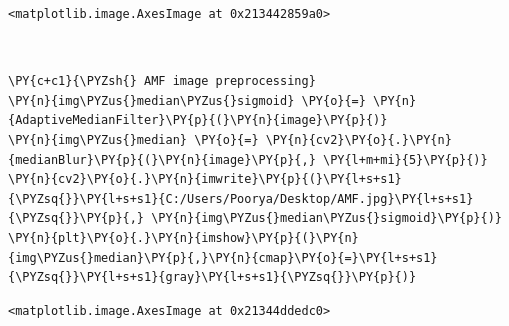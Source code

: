 \begin{tcolorbox}[breakable, size=fbox, boxrule=.5pt, pad at break*=1mm, opacityfill=0]
	\begin{Verbatim}[commandchars=\\\{\}]
<matplotlib.image.AxesImage at 0x213442859a0>
	\end{Verbatim}
\end{tcolorbox}

\begin{center}
\end{center}
{ \hspace*{\fill} \\}

\begin{tcolorbox}[breakable, size=fbox, boxrule=1pt, pad at break*=1mm,colback=cellbackground, colframe=cellborder]
	\begin{Verbatim}[commandchars=\\\{\}]
\PY{c+c1}{\PYZsh{} AMF image preprocessing}
\PY{n}{img\PYZus{}median\PYZus{}sigmoid} \PY{o}{=} \PY{n}{AdaptiveMedianFilter}\PY{p}{(}\PY{n}{image}\PY{p}{)}
\PY{n}{img\PYZus{}median} \PY{o}{=} \PY{n}{cv2}\PY{o}{.}\PY{n}{medianBlur}\PY{p}{(}\PY{n}{image}\PY{p}{,} \PY{l+m+mi}{5}\PY{p}{)}
\PY{n}{cv2}\PY{o}{.}\PY{n}{imwrite}\PY{p}{(}\PY{l+s+s1}{\PYZsq{}}\PY{l+s+s1}{C:/Users/Poorya/Desktop/AMF.jpg}\PY{l+s+s1}{\PYZsq{}}\PY{p}{,} \PY{n}{img\PYZus{}median\PYZus{}sigmoid}\PY{p}{)}
\PY{n}{plt}\PY{o}{.}\PY{n}{imshow}\PY{p}{(}\PY{n}{img\PYZus{}median}\PY{p}{,}\PY{n}{cmap}\PY{o}{=}\PY{l+s+s1}{\PYZsq{}}\PY{l+s+s1}{gray}\PY{l+s+s1}{\PYZsq{}}\PY{p}{)}
	\end{Verbatim}
\end{tcolorbox}

\begin{tcolorbox}[breakable, size=fbox, boxrule=.5pt, pad at break*=1mm, opacityfill=0]
	\begin{Verbatim}[commandchars=\\\{\}]
<matplotlib.image.AxesImage at 0x21344ddedc0>
	\end{Verbatim}
\end{tcolorbox}

\begin{center}
\end{center}
{ \hspace*{\fill} \\}

